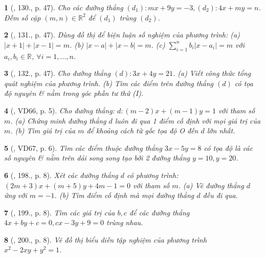 \documentclass{article}
\newtheorem{baitoan}{}
\begin{document}
\begin{baitoan}[\cite{Tuyen_Toan_9_old}, 130., p. 47]
	Cho các đường thẳng $(d_1):mx + 9y = -3,(d_2):4x + my = n$. Đếm số cặp $(m,n)\in\mathbb{R}^2$ để $(d_1)$ trùng $(d_2)$.
\end{baitoan}

\begin{baitoan}[\cite{Tuyen_Toan_9_old}, 131., p. 47]
	Dùng đồ thị để biện luận số nghiệm của phương trình: (a) $|x + 1| + |x - 1| = m$. (b) $|x - a| + |x - b| = m$. (c) $\sum_{i=1}^n b_i|x - a_i| = m$ với $a_i,b_i\in\mathbb{R}$, $\forall i = 1,\ldots,n$.
\end{baitoan}

\begin{baitoan}[\cite{Tuyen_Toan_9_old}, 132., p. 47]
	Cho đường thẳng $(d):3x + 4y = 21$. (a) Viết công thức tổng quát nghiệm của phương trình. (b) Tìm các điểm trên đường thẳng $(d)$ có tọa độ nguyên \& nằm trong góc phần tư thứ (I).
\end{baitoan}

\begin{baitoan}[\cite{Binh_Toan_9_tap_2}, VD66, p. 5]
	Cho đường thẳng: $d:(m - 2)x + (m - 1)y = 1$ với tham số $m$. (a) Chứng minh đường thẳng $d$ luôn đi qua 1 điểm cố định với mọi giá trị của $m$. (b) Tìm giá trị của $m$ để khoảng cách từ gốc tọa độ O đến $d$ lớn nhất.
\end{baitoan}

\begin{baitoan}[\cite{Binh_Toan_9_tap_2}, VD67, p. 6]
	Tìm các điểm thuộc đường thẳng $3x - 5y = 8$ có tọa độ là các số nguyên \& nằm trên dải song song tạo bởi 2 đường thẳng $y = 10,y = 20$.
\end{baitoan}

\begin{baitoan}[\cite{Binh_Toan_9_tap_2}, 198., p. 8]
	Xét các đường thẳng $d$ có phương trình: $(2m + 3)x + (m + 5)y + 4m - 1 = 0$ với tham số $m$. (a) Vẽ đường thẳng $d$ ứng với $m = -1$. (b) Tìm điểm cố định mà mọi đường thẳng $d$ đều đi qua.
\end{baitoan}

\begin{baitoan}[\cite{Binh_Toan_9_tap_2}, 199., p. 8]
	Tìm các giá trị của $b,c$ để các đường thẳng $4x + by + c = 0,cx - 3y + 9 = 0$ trùng nhau.
\end{baitoan}

\begin{baitoan}[\cite{Binh_Toan_9_tap_2}, 200., p. 8]
	Vẽ đồ thị biểu diễn tập nghiệm của phương trình $x^2 - 2xy + y^2 = 1$.
\end{baitoan}
\end{document}
